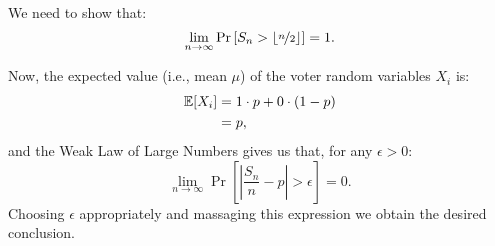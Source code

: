 \documentclass[preview, border={0pt 5pt 0pt 1pt}]{standalone} %
\begin{document}


    We need to show that:
    \[
        \lim_{n \rightarrow \infty} \Pr\left[ S_n > \lfloor \nicefrac{n}{2} \rfloor \right] = 1.
    \]

    Now, the expected value (i.e., mean \(\mu\)) of the voter random variables \(X_i\) is:
    \begin{align*}
        \mathbb{E}[X_i] & = 1 \cdot p + 0 \cdot (1-p) \\ 
                  & = p,
    \end{align*}
    and the Weak Law of Large Numbers gives us that, for any \(\epsilon > 0\):
    \[
        \lim_{n \rightarrow \infty} \Pr\left[ \left| \frac{S_n}{n} - p\right| > \epsilon  \right] = 0.
    \]
    Choosing \(\epsilon\) appropriately and massaging this expression we obtain the desired conclusion.
\end{document}
